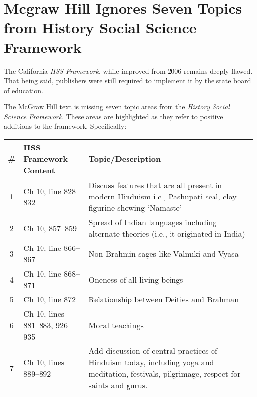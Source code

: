 \chapter[Mcgraw Hill Ignores Seven Topics from\\ History Social Science Framework]{Mcgraw Hill Ignores Seven Topics from History Social Science Framework}

The California \textit{HSS Framework}, while improved from 2006 remains deeply flawed. That being said, publishers were still required to implement it by the state board of education.

The McGraw Hill text is missing seven topic areas from the \textit{History Social Science Framework}. These areas are highlighted as they refer to positive additions to the framework. Specifically:

\begin{longtable}{|c|p{3.5cm}|p{5.5cm}|}
\hline 
\# & HSS Framework Content & Topic/Description\tabularnewline
\hline
1 & Ch 10, line 828--832 &  Discuss features that are all present in modern Hinduism i.e., Pashupati seal, clay figurine showing ‘Namaste’\tabularnewline
\hline
2 & Ch 10, 857--859 & Spread of Indian languages including alternate theories (i.e., it originated in India)\tabularnewline 
\hline
3 & Ch 10, line 866--867 & Non-Brahmin sages like Vālmīki and Vyasa\tabularnewline
\hline
4 & Ch 10, line 868--871 & Oneness of all living beings\tabularnewline
\hline
5 & Ch 10, line 872 & Relationship between Deities and Brahman\tabularnewline
\hline
6 & Ch 10, lines 881--883, 926--935 & Moral teachings\tabularnewline
\hline
7 & Ch 10, lines 889--892 & Add discussion of central practices of Hinduism today, including yoga and meditation, festivals, pilgrimage, respect for saints 
and gurus.\tabularnewline
\hline
\end{longtable}

